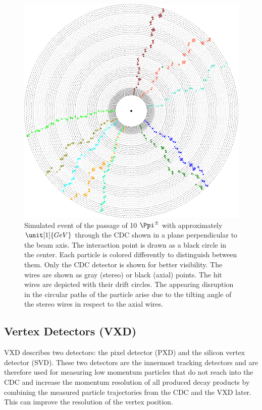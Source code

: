\begin{figure}
  \centering
  \includegraphics[width=0.8\linewidth]{figures/experimental_setup/eventDisplayPionGun.png}
  \caption[Simulated event of the passage of 10 $\Ppi^\pm$ through the CDC.]{Simulated event of the passage of 10 $\Ppi^\pm$ with approximately $\unit[1]{GeV}$ through the CDC shown in a plane perpendicular to the beam axis. The interaction point is drawn as a black circle in the center. Each particle is colored differently to distinguish between them. Only the CDC detector is shown for better visibility. The wires are shown as gray (stereo) or black (axial) points. The hit wires are depicted with their drift circles. The appearing disruption in the circular paths of the particle arise due to the tilting angle of the stereo wires in respect to the axial wires.}
  \label{fig-event-display}
\end{figure}

\subsection{Vertex Detectors (VXD)}
VXD describes two detectors: the pixel detector (PXD) and the silicon vertex detector (SVD). These two detectors are the innermost tracking detectors and are therefore used for measuring low momentum particles that do not reach into the CDC and increase the momentum resolution of all produced decay products by combining the measured particle trajectories from the CDC and the VXD later. This can improve the resolution of the vertex position.

